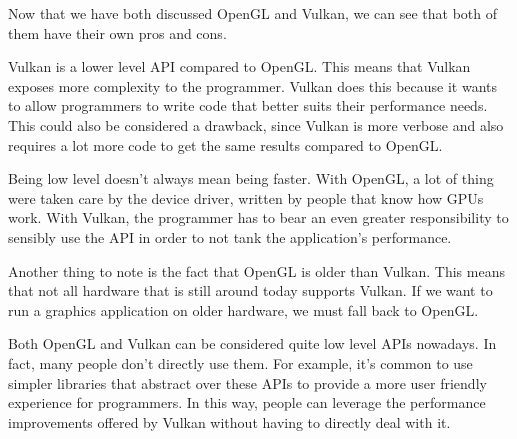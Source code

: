 Now that we have both discussed OpenGL and Vulkan, we can see that both of
them have their own pros and cons.

Vulkan is a lower level API compared to OpenGL.
This means that Vulkan exposes more complexity to the programmer.
Vulkan does this because it wants to allow programmers to write code that
better suits their performance needs.
This could also be considered a drawback, since Vulkan is more verbose and
also requires a lot more code to get the same results compared to OpenGL.

Being low level doesn't always mean being faster.
With OpenGL, a lot of thing were taken care by the device driver, written
by people that know how GPUs work.
With Vulkan, the programmer has to bear an even greater responsibility
to sensibly use the API in order to not tank the application's performance.

Another thing to note is the fact that OpenGL is older than Vulkan.
This means that not all hardware that is still around today supports Vulkan.
If we want to run a graphics application on older hardware, we must fall back
to OpenGL.

Both OpenGL and Vulkan can be considered quite low level APIs nowadays.
In fact, many people don't directly use them.
For example, it's common to use simpler libraries that abstract over these
APIs to provide a more user friendly experience for programmers.
In this way, people can leverage the performance improvements offered by Vulkan
without having to directly deal with it.
